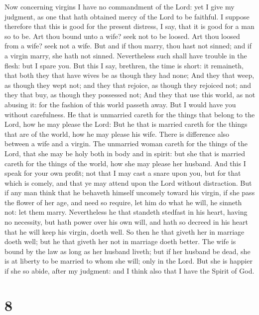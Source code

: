  Now concerning virgins I have no commandment of the
Lord: yet I give my judgment, as one that hath obtained mercy of the
Lord to be faithful.  I suppose therefore that this is
good for the present distress, I say, that it is good for a man so to
be.  Art thou bound unto a wife? seek not to be loosed.
Art thou loosed from a wife? seek not a wife.  But and if
thou marry, thou hast not sinned; and if a virgin marry, she hath not
sinned. Nevertheless such shall have trouble in the flesh: but I spare
you.  But this I say, brethren, the time is short: it
remaineth, that both they that have wives be as though they had none;
 And they that weep, as though they wept not; and they
that rejoice, as though they rejoiced not; and they that buy, as though
they possessed not;  And they that use this world, as not
abusing it: for the fashion of this world passeth away. 
But I would have you without carefulness. He that is unmarried careth
for the things that belong to the Lord, how he may please the Lord:
 But he that is married careth for the things that are of
the world, how he may please his wife.  There is
difference also between a wife and a virgin. The unmarried woman careth
for the things of the Lord, that she may be holy both in body and in
spirit: but she that is married careth for the things of the world, how
she may please her husband.  And this I speak for your
own profit; not that I may cast a snare upon you, but for that which is
comely, and that ye may attend upon the Lord without distraction.
 But if any man think that he behaveth himself uncomely
toward his virgin, if she pass the flower of her age, and need so
require, let him do what he will, he sinneth not: let them marry.
 Nevertheless he that standeth stedfast in his heart,
having no necessity, but hath power over his own will, and hath so
decreed in his heart that he will keep his virgin, doeth well.
 So then he that giveth her in marriage doeth well; but
he that giveth her not in marriage doeth better.  The
wife is bound by the law as long as her husband liveth; but if her
husband be dead, she is at liberty to be married to whom she will; only
in the Lord.  But she is happier if she so abide, after
my judgment: and I think also that I have the Spirit of God.

\hypertarget{section-7}{%
\section{8}\label{section-7}}

